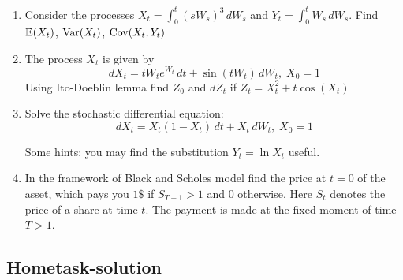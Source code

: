 \documentclass[12pt, a4paper]{article}
\begin{document}
\begin{enumerate}
\item Consider the processes $X_t=\int_0^t (s W_s)^3 \,dW_s$ and $Y_t=\int_0^t W_s \, dW_s$. Find $\mathbb{E}(X_t)$, $\operatorname{Var}(X_t)$, $\operatorname{Cov}(X_t,Y_t)$

\item The process $X_t$ is given by
\[
dX_t=tW_t e^{W_t} \, dt + \sin (tW_t) \, dW_t, \; X_0=1
\]
Using Ito-Doeblin lemma find $Z_0$ and $dZ_t$ if $Z_t=X_t^2+t\cos (X_t)$

\item Solve the stochastic differential equation:
\[
dX_t=X_t(1-X_t) \, dt+X_t \, dW_t, \; X_0=1
\]

Some hints: you may find the substitution $Y_t = \ln X_t$ useful.

\item In the framework of Black and Scholes model find the price at $t=0$ of the asset, which pays you $1 \$ $  if $S_{T-1}>1$ and $0$ otherwise. Here $S_t$ denotes the price of a share at time $t$. The payment is made at the fixed moment of time $T >1$.

\end{enumerate}


\subsection{Hometask-solution}
\end{document}
